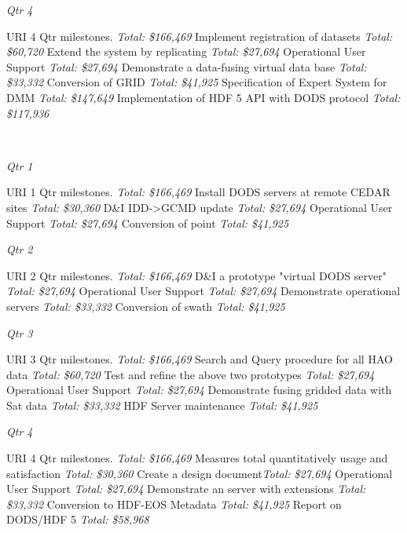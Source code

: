 \documentclass[12pt]{article}
\begin{document}
  \centerline{\it Qtr 4}

 URI 4 Qtr milestones.  {\it Total: \$166,469}
 Implement registration of datasets {\it Total: \$60,720}
  Extend the system by replicating {\it Total: \$27,694}
 Operational User Support {\it Total: \$27,694}
 Demonstrate a data-fusing virtual data base {\it
  Total: \$33,332}
 Conversion of GRID {\it Total: \$41,925}
 Specification of Expert System for DMM {\it Total: \$147,649}
 Implementation of HDF 5 API with DODS protocol {\it Total: \$117,936}

\vspace{.2in}
\\
  \centerline{\it Qtr 1}

 URI 1 Qtr milestones.  {\it Total: \$166,469}
 Install DODS servers at remote CEDAR sites {\it
  Total: \$30,360}
 D\&I IDD->GCMD update {\it Total: \$27,694}
 Operational User Support {\it Total: \$27,694}
 Conversion of point {\it Total: \$41,925}

  \centerline{\it Qtr 2}

 URI 2 Qtr milestones.  {\it   Total: \$166,469}
 D\&I a prototype "virtual DODS server" {\it Total:
  \$27,694}
 Operational User Support {\it Total: \$27,694}
 Demonstrate operational servers {\it Total: \$33,332}
 Conversion of swath {\it Total: \$41,925}

  \centerline{\it Qtr 3}

 URI 3 Qtr milestones.  {\it Total: \$166,469}
 Search and Query procedure for all HAO data {\it
  Total: \$60,720}
 Test and refine the above two prototypes {\it
  Total: \$27,694}
 Operational User Support {\it Total: \$27,694}
 Demonstrate fusing gridded data with Sat data {\it
  Total: \$33,332}
 HDF Server maintenance {\it Total: \$41,925}

  \centerline{\it Qtr 4 }

 URI 4 Qtr milestones.  {\it Total: \$166,469}
 Measures total quantitatively usage and satisfaction
{\it Total: \$30,360}
 Create a design document{\it Total: \$27,694}
 Operational User Support {\it Total: \$27,694}
 Demonstrate an server with extensions {\it Total: \$33,332}
 Conversion to HDF-EOS Metadata {\it Total: \$41,925}
 Report on DODS/HDF 5 {\it Total: \$58,968}
\vfill\eject
\end{document}
